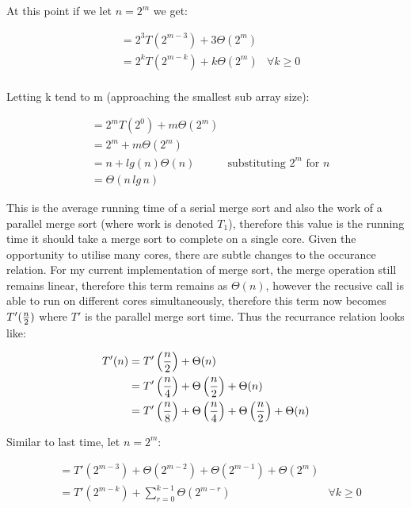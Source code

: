 \documentclass[12pt,twoside,notitlepage]{report}
\begin{document}
At this point if we let $n = 2^{m}$ we get:

\begin{align*}
&= 2^{3}T\left(2^{m-3}\right) + 3\Theta\left(2^{m}\right) \\
&= 2^{k}T\left(2^{m-k}\right) + k\Theta\left(2^{m}\right) & \forall k \geq 0\\
\end{align*}

Letting k tend to m (approaching the smallest sub array size):

\begin{align*}
&= 2^{m}T\left(2^{0}\right) + m\Theta\left(2^{m}\right) \\
&= 2^{m} + m\Theta\left(2^{m}\right) \\
&= n + lg(n)\Theta(n) & \text{substituting $2^{m}$ for $n$} \\
&= \Theta(n\,{lg\,{n}}) 
\end{align*}

This is the average running time of a serial merge sort and also the work of a parallel merge sort (where work is denoted $T_1$), therefore this value is the running time it should take a merge sort to complete on a single core. Given
the opportunity to utilise many cores, there are subtle changes to the occurance relation. For my current implementation of merge sort, the merge operation still remains linear, therefore this term remains as $\Theta(n)$, however the
recusive call is able to run on different cores simultaneously, therefore this term now becomes $T'({n \over 2})$ where $T'$ is the parallel merge sort time. Thus the recurrance relation looks like:

\begin{align*}
T'(n) &= T'\left({n \over 2}\right) + \Theta(n) \\
&= T'\left({n \over 4}\right) + \Theta\left({n \over 2}\right) + \Theta(n) \\
&= T'\left({n \over 8}\right) + \Theta\left({n \over 4}\right) + \Theta\left({n \over 2}\right) + \Theta(n) \\
\end{align*}

Similar to last time, let $n = 2^{m}$:

\begin{align*}
&= T'\left(2^{m-3}\right) + \Theta\left(2^{m-2}\right) + \Theta\left(2^{m-1}\right) + \Theta(2^{m}) \\
&= T'\left(2^{m-k}\right) + \sum_{r=0}^{k-1} \Theta\left(2^{m-r}\right) & \forall k \geq 0 \\
\end{align*}
\end{document}
